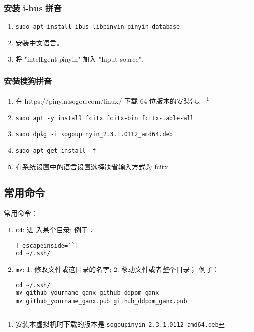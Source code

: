 \documentclass[cn,11pt, simple]{elegantbook}
\begin{document}
\subsubsection{安装 i-bus 拼音}%
\label{ssub:pinyin-i-bus}
\begin{enumerate}
    \item \lstinline{sudo apt install ibus-libpinyin pinyin-database}
    \item 安装中文语言。
    \item 将 "intelligent pinyin" 加入 "Input source".
\end{enumerate}

\subsubsection{安装搜狗拼音}%
\label{ssub:pinyin-sogou}
\begin{enumerate}
    \item 在 \href{https://pinyin.sogou.com/linux/}
        {https://pinyin.sogou.com/linux/} 下载 64 位版本的安装包。
        \footnote{安装本虚拟机时下载的版本是
            \lstinline{sogoupinyin_2.3.1.0112_amd64.deb}
        }
    \item \lstinline{sudo apt -y install fcitx fcitx-bin fcitx-table-all}
    \item \lstinline{sudo dpkg -i sogoupinyin_2.3.1.0112_amd64.deb}
    \item \lstinline{sudo apt-get install -f}
    \item 在系统设置中的语言设置选择缺省输入方式为 fcitx.
\end{enumerate}

\subsection{常用命令}%
\label{sub:linux-commands}

常用命令：
\begin{enumerate}
    \item \lstinline{cd}: 进 入某个目录; 例子：
\begin{lstlisting}[ escapeinside=``]
cd ~/.ssh/
\end{lstlisting}
    \item \lstinline{mv}: 1. 修改文件或这目录的名字; 2.
        移动文件或者整个目录； 例子：
\begin{lstlisting}[escapeinside=``]
cd ~/.ssh/
mv github_yourname_ganx github_ddpom_ganx
mv github_yourname_ganx.pub github_ddpom_ganx.pub
\end{lstlisting}
\end{enumerate}
\end{document}
